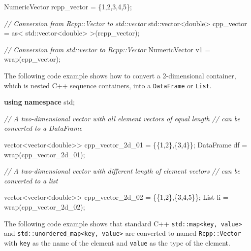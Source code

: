 \documentclass[
]{book}
\newenvironment{Shaded}{\begin{snugshade}}{\end{snugshade}}
\newcommand{\BuiltInTok}[1]{#1}
\newcommand{\CommentTok}[1]{\textcolor[rgb]{0.56,0.35,0.01}{\textit{#1}}}
\newcommand{\DataTypeTok}[1]{\textcolor[rgb]{0.13,0.29,0.53}{#1}}
\newcommand{\DecValTok}[1]{\textcolor[rgb]{0.00,0.00,0.81}{#1}}
\newcommand{\KeywordTok}[1]{\textcolor[rgb]{0.13,0.29,0.53}{\textbf{#1}}}
\newcommand{\NormalTok}[1]{#1}
\begin{document}
\begin{Shaded}
\begin{Highlighting}[]
\NormalTok{NumericVector   rcpp_vector = \{}\DecValTok{1}\NormalTok{,}\DecValTok{2}\NormalTok{,}\DecValTok{3}\NormalTok{,}\DecValTok{4}\NormalTok{,}\DecValTok{5}\NormalTok{\};}

\CommentTok{// Conversion from Rcpp::Vector to std::vector  }
\BuiltInTok{std::}\NormalTok{vector<}\DataTypeTok{double}\NormalTok{>  cpp_vector = as< }\BuiltInTok{std::}\NormalTok{vector<}\DataTypeTok{double}\NormalTok{> >(rcpp_vector);}

\CommentTok{// Conversion from std::vector to Rcpp::Vector  }
\NormalTok{NumericVector v1 = wrap(cpp_vector);}
\end{Highlighting}
\end{Shaded}

The following code example shows how to convert a 2-dimensional container, which is nested C++ sequence containers, into a \texttt{DataFrame} or \texttt{List}.

\begin{Shaded}
\begin{Highlighting}[]
\KeywordTok{using} \KeywordTok{namespace}\NormalTok{ std;}

\CommentTok{// A two-dimensional vector with all element vectors of equal length}
\CommentTok{// can be converted to a DataFrame}

\NormalTok{vector<vector<}\DataTypeTok{double}\NormalTok{>> cpp_vector_2d_01 = \{\{}\DecValTok{1}\NormalTok{,}\DecValTok{2}\NormalTok{\},\{}\DecValTok{3}\NormalTok{,}\DecValTok{4}\NormalTok{\}\};}
\NormalTok{DataFrame df = wrap(cpp_vector_2d_01);}

\CommentTok{// A two-dimensional vector with different length of element vectors}
\CommentTok{// can be converted to a list}

\NormalTok{vector<vector<}\DataTypeTok{double}\NormalTok{>> cpp_vector_2d_02 = \{\{}\DecValTok{1}\NormalTok{,}\DecValTok{2}\NormalTok{\},\{}\DecValTok{3}\NormalTok{,}\DecValTok{4}\NormalTok{,}\DecValTok{5}\NormalTok{\}\};}
\NormalTok{List li = wrap(cpp_vector_2d_02);}
\end{Highlighting}
\end{Shaded}

The following code example shows that standard C++ \texttt{std::map\textless{}key,\ value\textgreater{}} and \texttt{std::unordered\_map\textless{}key,\ value\textgreater{}} are converted to named \texttt{Rcpp::Vector} with \texttt{key} as the name of the element and \texttt{value} as the type of the element.
\end{document}
